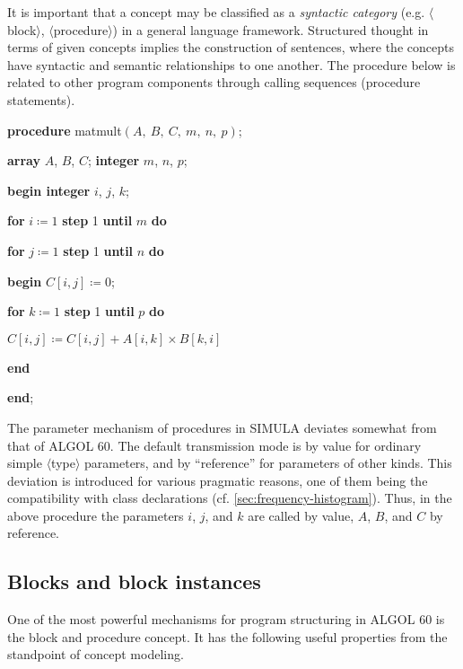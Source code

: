 It is important that a concept may be classified as a \textit{syntactic category} (e.g. $\langle$block$\rangle$, $\langle$procedure$\rangle$) in a general language framework. Structured thought in terms of given concepts implies the construction of sentences, where the concepts have syntactic and semantic relationships to one another. The procedure below is related to other program components through calling sequences (procedure statements).

\quad \textbf{procedure} matmult$(A,\ B,\ C,\ m,\ n,\ p)$;

\quad \quad \textbf{array} $A$, $B$, $C$; \textbf{integer} $m$, $n$, $p$;

\quad \textbf{begin integer} $i$, $j$, $k$;

\quad \quad \textbf{for} $i\coloneq 1$ \textbf{step} 1 \textbf{until} $m$ \textbf{do}

\quad \quad \textbf{for} $j\coloneq 1$ \textbf{step} 1 \textbf{until} $n$ \textbf{do}

\quad \quad \textbf{begin} $C[i, j]\coloneq 0$;

\quad \quad \quad \textbf{for} $k\coloneq 1$ \textbf{step} 1 \textbf{until} $p$ \textbf{do}

\quad \quad \quad \quad $C[i, j]\coloneq C[i, j] + A[i, k] \times B[k, i]$

\quad \quad \textbf{end}

\quad \textbf{end};

The parameter mechanism of procedures in SIMULA deviates somewhat from that of ALGOL 60. The default transmission mode is by value for ordinary simple $\langle$type$\rangle$ parameters, and by ``reference'' for parameters of other kinds. This deviation is introduced for various pragmatic reasons, one of them being the compatibility with class declarations (cf. \ref{sec:frequency-histogram}). Thus, in the above procedure the parameters $i$, $j$, and $k$ are called by value, $A$, $B$, and $C$ by reference.

\subsection{Blocks and block instances}

One of the most powerful mechanisms for program structuring in ALGOL 60 is the block and procedure concept. It has the following useful properties from the standpoint of concept modeling.

